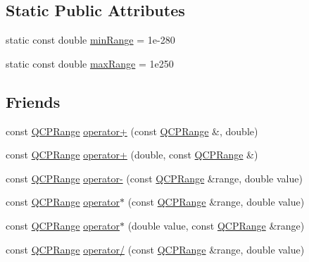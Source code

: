\subsection*{Static Public Attributes}
\begin{DoxyCompactItemize}
\item 
static const double \mbox{\hyperlink{class_q_c_p_range_ab46d3bc95030ee25efda41b89e2b616b}{min\+Range}} = 1e-\/280
\item 
static const double \mbox{\hyperlink{class_q_c_p_range_a5ca51e7a2dc5dc0d49527ab171fe1f4f}{max\+Range}} = 1e250
\end{DoxyCompactItemize}
\subsection*{Friends}
\begin{DoxyCompactItemize}
\item 
const \mbox{\hyperlink{class_q_c_p_range}{Q\+C\+P\+Range}} \mbox{\hyperlink{class_q_c_p_range_af53ea6fb823a4a5897162b865841de04}{operator+}} (const \mbox{\hyperlink{class_q_c_p_range}{Q\+C\+P\+Range}} \&, double)
\item 
const \mbox{\hyperlink{class_q_c_p_range}{Q\+C\+P\+Range}} \mbox{\hyperlink{class_q_c_p_range_a9fb2e9941d32001482df670c0d704977}{operator+}} (double, const \mbox{\hyperlink{class_q_c_p_range}{Q\+C\+P\+Range}} \&)
\item 
const \mbox{\hyperlink{class_q_c_p_range}{Q\+C\+P\+Range}} \mbox{\hyperlink{class_q_c_p_range_a797f82830b516646da8873f82e39e356}{operator-\/}} (const \mbox{\hyperlink{class_q_c_p_range}{Q\+C\+P\+Range}} \&range, double value)
\item 
const \mbox{\hyperlink{class_q_c_p_range}{Q\+C\+P\+Range}} \mbox{\hyperlink{class_q_c_p_range_a558b1248ff6a9e41fd5b2630555a8acc}{operator$\ast$}} (const \mbox{\hyperlink{class_q_c_p_range}{Q\+C\+P\+Range}} \&range, double value)
\item 
const \mbox{\hyperlink{class_q_c_p_range}{Q\+C\+P\+Range}} \mbox{\hyperlink{class_q_c_p_range_a5cb2332f6957021f47cc768089f4f090}{operator$\ast$}} (double value, const \mbox{\hyperlink{class_q_c_p_range}{Q\+C\+P\+Range}} \&range)
\item 
const \mbox{\hyperlink{class_q_c_p_range}{Q\+C\+P\+Range}} \mbox{\hyperlink{class_q_c_p_range_a4b366a3a21974c88e09b0d39d4a24a4b}{operator/}} (const \mbox{\hyperlink{class_q_c_p_range}{Q\+C\+P\+Range}} \&range, double value)
\end{DoxyCompactItemize}


